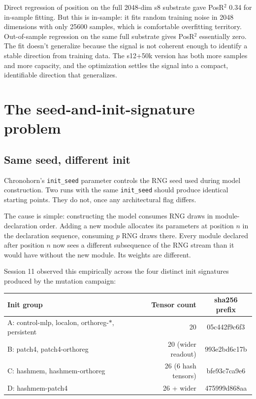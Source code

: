 \documentclass[11pt,openany]{book}
\begin{document}
Direct regression of position on the full 2048-dim s8 substrate gave
PosR$^2$ 0.34 for in-sample fitting. But this is in-sample: it fits
random training noise in 2048 dimensions with only 25600 samples,
which is comfortable overfitting territory. Out-of-sample regression
on the same full substrate gives PosR$^2$ essentially zero. The fit
doesn't generalize because the signal is not coherent enough to
identify a stable direction from training data. The s12+50k version
has both more samples and more capacity, and the optimization settles
the signal into a compact, identifiable direction that generalizes.

\chapter{The seed-and-init-signature problem}

\section{Same seed, different init}

Chronohorn's \texttt{init\_seed} parameter controls the RNG seed
used during model construction. Two runs with the same
\texttt{init\_seed} should produce identical starting points. They
do not, once any architectural flag differs.

The cause is simple: constructing the model consumes RNG draws in
module-declaration order. Adding a new module allocates its parameters
at position $n$ in the declaration sequence, consuming $p$ RNG draws
there. Every module declared after position $n$ now sees a different
subsequence of the RNG stream than it would have without the new
module. Its weights are different.

Session 11 observed this empirically across the four distinct init
signatures produced by the mutation campaign:

\begin{longtable}{lrc}
\toprule
Init group & Tensor count & sha256 prefix \\
\midrule
A: control-mlp, localon, orthoreg-$*$, persistent & 20 & 05c442f9c6f3 \\
B: patch4, patch4-orthoreg & 20 (wider readout) & 993e2bd6c17b \\
C: hashmem, hashmem-orthoreg & 26 (6 hash tensors) & bfe93c7ca9e6 \\
D: hashmem-patch4 & 26 + wider & 475999d868aa \\
\bottomrule
\end{longtable}
\end{document}
